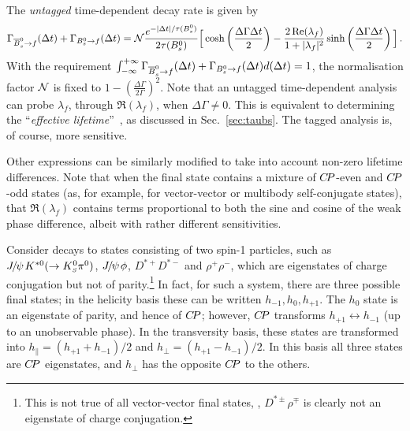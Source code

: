 The {\it untagged} time-dependent decay rate is given by
\begin{equation}
  \Gamma_{\Bsbar \to f} (\Delta t) + \Gamma_{\Bs \to f} (\Delta t)
  = 
  {\cal N} %
  \frac{e^{-| \Delta t | / \tau(\Bs)}}{2\tau(\Bs)}
  \Big[ 
  \cosh\left(\frac{\Delta \Gamma \Delta t}{2}\right) -
  \frac{2\, \Re(\lambda_f)}{1 + |\lambda_f|^2} \sinh\left(\frac{\Delta \Gamma \Delta t}{2}\right)
  \Big] \, .
\end{equation}
With the requirement
$\int_{-\infty}^{+\infty} \Gamma_{\Bsbar \to f} (\Delta t) + \Gamma_{\Bs \to f} (\Delta t) d(\Delta t) = 1$,
the normalisation factor ${\cal N}$ 
is fixed to $1 - (\frac{\Delta \Gamma}{2\Gamma})^2$.
Note that an untagged time-dependent analysis can probe
$\lambda_f$, through $\Re(\lambda_f)$, when $\Delta \Gamma \neq 0$.
This is equivalent to determining the ``{\it effective lifetime}''~\cite{Fleischer:2011cw}, as discussed in Sec.~\ref{sec:taubs}.
The tagged analysis is, of course, more sensitive.

Other expressions can be similarly modified to take into account 
non-zero lifetime differences.
Note that when the final state contains 
a mixture of $C\!P$-even and $C\!P$-odd states
(as, for example, for vector-vector or multibody self-conjugate states),
that $\Re(\lambda_f)$ contains terms proportional to 
both the sine and cosine of the weak phase difference, 
albeit with rather different sensitivities.

\label{sec:cp_uta:notations:vv}

Consider \B decays to states consisting of two spin-1 particles,
such as ${J\mskip -3mu/\mskip -2mu\psi\mskip 2mu} K^{*0}(\to K^0_{\scriptscriptstyle S}\pi^0)$, ${J\mskip -3mu/\mskip -2mu\psi\mskip 2mu}\phi$, $D^{*+}D^{*-}$ and $\rho^+\rho^-$,
which are eigenstates of charge conjugation but not of parity.\footnote{
  \noindent
  This is not true of all vector-vector final states,
  \eg, $D^{*\pm}\rho^{\mp}$ is clearly not an eigenstate of 
  charge conjugation.
}
In fact, for such a system, there are three possible final states;
in the helicity basis these can be written $h_{-1}, h_0, h_{+1}$.
The $h_0$ state is an eigenstate of parity, and hence of $C\!P$;
however, $C\!P$ transforms $h_{+1} \leftrightarrow h_{-1}$ (up to 
an unobservable phase). In the transversity basis, these states 
are transformed into  $h_\parallel =  (h_{+1} + h_{-1})/2$ and 
$h_\perp = (h_{+1} - h_{-1})/2$.
In this basis all three states are $C\!P$ eigenstates, 
and $h_\perp$ has the opposite $C\!P$ to the others.


